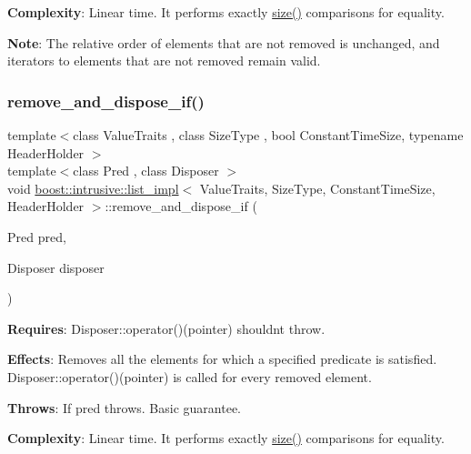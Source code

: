 {\bfseries Complexity}\+: Linear time. It performs exactly \hyperlink{classboost_1_1intrusive_1_1list__impl_a9da0074a31566f3a7dbc3cd1a2d752c1}{size()} comparisons for equality.

{\bfseries Note}\+: The relative order of elements that are not removed is unchanged, and iterators to elements that are not removed remain valid. \mbox{\label{classboost_1_1intrusive_1_1list__impl_afb94638a081eb6fed0bf005b04cf9f88}} 
\subsubsection{\texorpdfstring{remove\+\_\+and\+\_\+dispose\+\_\+if()}{remove\_and\_dispose\_if()}}
{\footnotesize\ttfamily template$<$class Value\+Traits , class Size\+Type , bool Constant\+Time\+Size, typename Header\+Holder $>$ \\
template$<$class Pred , class Disposer $>$ \\
void \hyperlink{classboost_1_1intrusive_1_1list__impl}{boost\+::intrusive\+::list\+\_\+impl}$<$ Value\+Traits, Size\+Type, Constant\+Time\+Size, Header\+Holder $>$\+::remove\+\_\+and\+\_\+dispose\+\_\+if (\begin{DoxyParamCaption}\item[{Pred}]{pred,  }\item[{Disposer}]{disposer }\end{DoxyParamCaption})\hspace{0.3cm}{\ttfamily [inline]}}

{\bfseries Requires}\+: Disposer\+::operator()(pointer) shouldn\textquotesingle{}t throw.

{\bfseries Effects}\+: Removes all the elements for which a specified predicate is satisfied. Disposer\+::operator()(pointer) is called for every removed element.

{\bfseries Throws}\+: If pred throws. Basic guarantee.

{\bfseries Complexity}\+: Linear time. It performs exactly \hyperlink{classboost_1_1intrusive_1_1list__impl_a9da0074a31566f3a7dbc3cd1a2d752c1}{size()} comparisons for equality.


